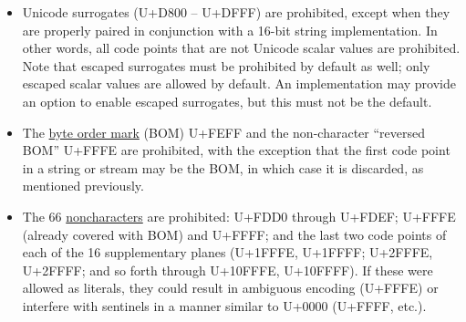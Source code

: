 \documentclass[11pt]{article}
\begin{document}
\begin{itemize}
Bidi override characters can be a security concern in general, and are particularly problematic in a configuration format designed for manual editing.   \href{http://unicode.org/reports/tr36/}{Unicode Technical Report \#36}, ``Unicode Security Considerations,'' recommends that overrides never be allowed in IRIs.  

However, even the implicit directional marks can have a potent effect when operating on punctuation characters.  For example, the sequence
\begin{Verbatim}
{"a"="b\u200f", $=!, "\u200fe"="f"}
\end{Verbatim}
is clear when escapes are used, but when literal code points are substituted, it renders as
\begin{Verbatim}
{"a"="b" ,!=$ ,"e"="f"}
\end{Verbatim}
in many text editors.

It would be possible to restrict the use of bidi control characters to multiline string literals, which have delimiters on separate lines from the actual string content.  Even in that context, however, the characters could be used to spoof the ending delimiter of the string, and the existence of one or more additional elements that are not actually present.  This could be mitigated by prohibiting the bidi controls from being immediately adjacent to delimiter characters, but that would only be effective if the separating characters were not only visible but also relatively easy to see.  Thus, these code points are completely prohibited as literals.

\item Unicode surrogates (U+D800 -- U+DFFF) are prohibited, except when they are properly paired in conjunction with a 16-bit string implementation.  In other words, all code points that are not Unicode scalar values are prohibited.  Note that escaped surrogates must be prohibited by default as well; only escaped scalar values are allowed by default.  An implementation may provide an option to enable escaped surrogates, but this must not be the default.

\item The \href{http://www.unicode.org/faq/utf_bom.html#bom1}{byte order mark} (BOM) U+FEFF and the non-character ``reversed BOM'' U+FFFE are prohibited, with the exception that the first code point in a string or stream may be the BOM, in which case it is discarded, as mentioned previously.

\item The 66 \href{http://www.unicode.org/faq/private_use.html#noncharacters}{noncharacters} are prohibited:  U+FDD0 through U+FDEF; U+FFFE (already covered with BOM) and U+FFFF; and the last two code points of each of the 16 supplementary planes (U+1FFFE, U+1FFFF; U+2FFFE, U+2FFFF; and so forth through U+10FFFE, U+10FFFF).  If these were allowed as literals, they could result in ambiguous encoding (U+FFFE) or interfere with sentinels in a manner similar to U+0000 (U+FFFF, etc.).
\end{itemize}
\end{document}
